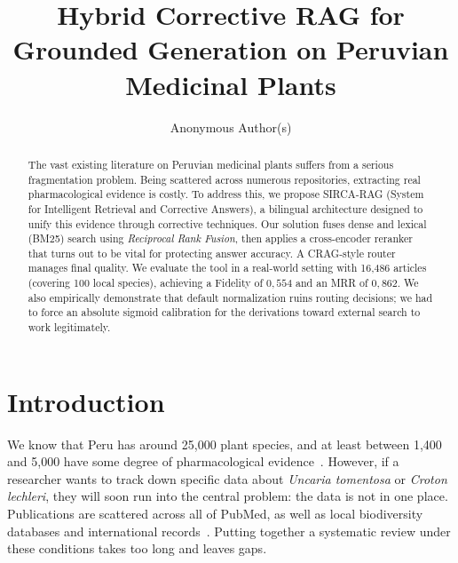 \documentclass[runningheads]{llncs}
\title{Hybrid Corrective RAG for Grounded Generation
on Peruvian Medicinal Plants}
\author{Anonymous Author(s)}
\institute{Affiliation withheld for double-blind review}
\newcommand{\sirca}{\textsc{SIRCA-RAG}}
\begin{document}
\sloppy
\maketitle

\begin{abstract}
The vast existing literature on Peruvian medicinal plants suffers from a serious fragmentation problem. Being scattered across numerous repositories, extracting real pharmacological evidence is costly. To address this, we propose \sirca{} (System for Intelligent Retrieval and Corrective Answers), a bilingual architecture designed to unify this evidence through corrective techniques. Our solution fuses dense and lexical (BM25) search using \emph{Reciprocal Rank Fusion}, then applies a cross-encoder reranker that turns out to be vital for protecting answer accuracy. A CRAG-style router manages final quality. We evaluate the tool in a real-world setting with 16{,}486 articles (covering 100 local species), achieving a Fidelity of $0{,}554$ and an MRR of $0{,}862$. We also empirically demonstrate that default normalization ruins routing decisions; we had to force an absolute sigmoid calibration for the derivations toward external search to work legitimately.

\end{abstract}

\section{Introduction}
\label{sec:intro}

We know that Peru has around 25{,}000 plant species, and at least between 1{,}400 and 5{,}000 have some degree of pharmacological evidence~\cite{bussmann2006traditional,bussmann2011toxicity}. However, if a researcher wants to track down specific data about \textit{Uncaria tomentosa} or \textit{Croton lechleri}, they will soon run into the central problem: the data is not in one place. Publications are scattered across all of PubMed, as well as local biodiversity databases and international records~\cite{lock2016bioactive,gonzales2012ethnobiology}. Putting together a systematic review under these conditions takes too long and leaves gaps.
\end{document}
